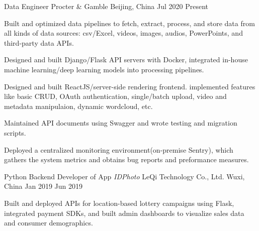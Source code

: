 

\begin{cventries}

  \cventry
    {Data Engineer} %
    {Procter \& Gamble} %
    {Beijing, China} %
    {Jul 2020 \textemdash Present} %
    {
      \begin{cvitems} %
        \item {Built and optimized data pipelines to fetch, extract, process, and store data from all kinds of data sources: csv/Excel, videos, images, audios, PowerPoints, and third-party data APIs.}
        \item {Designed and built Django/Flask API servers with Docker, integrated in-house machine learning/deep learning models into processing pipelines.}
        \item {Designed and built ReactJS/server-side rendering frontend. implemented features like basic CRUD, OAuth authentication, single/batch upload, video and metadata manipulaion, dynamic wordcloud, etc.}
        \item {Maintained API documents using Swagger and wrote testing and migration scripts.}
        \item {Deployed a centralized monitoring environment(on-premise Sentry), which gathers the system metrics and obtains bug reports and preformance measures.}
      \end{cvitems}
    }

  \cventry
    {Python Backend Developer of App \emph{IDPhoto}} %
    {LeQi Technology Co., Ltd.} %
    {Wuxi, China} %
    {Jan 2019 \textemdash Jun 2019} %
    {
      \begin{cvitems} %
        \item {Built and deployed APIs for location-based lottery campaigns using Flask, integrated payment SDKs, and built admin dashboards to visualize sales data and consumer demographics.}
      \end{cvitems}
    }


\end{cventries}
